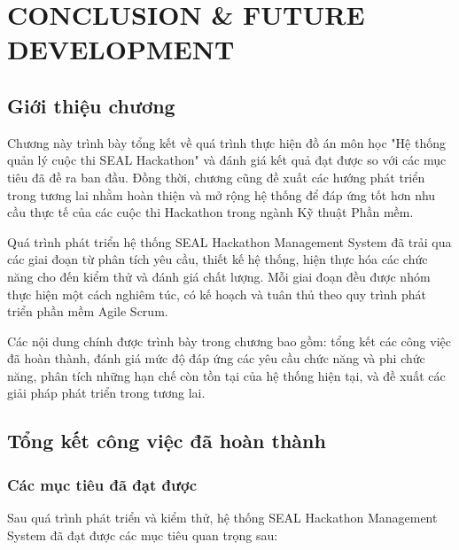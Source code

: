 ﻿\documentclass[12pt,a4paper]{report}
\begin{document}

\chapter{CONCLUSION \& FUTURE DEVELOPMENT}

\section{Giới thiệu chương}

Chương này trình bày tổng kết về quá trình thực hiện đồ án môn học "Hệ thống quản lý cuộc thi SEAL Hackathon" và đánh giá kết quả đạt được so với các mục tiêu đã đề ra ban đầu. Đồng thời, chương cũng đề xuất các hướng phát triển trong tương lai nhằm hoàn thiện và mở rộng hệ thống để đáp ứng tốt hơn nhu cầu thực tế của các cuộc thi Hackathon trong ngành Kỹ thuật Phần mềm.

Quá trình phát triển hệ thống SEAL Hackathon Management System đã trải qua các giai đoạn từ phân tích yêu cầu, thiết kế hệ thống, hiện thực hóa các chức năng cho đến kiểm thử và đánh giá chất lượng. Mỗi giai đoạn đều được nhóm thực hiện một cách nghiêm túc, có kế hoạch và tuân thủ theo quy trình phát triển phần mềm Agile Scrum.

Các nội dung chính được trình bày trong chương bao gồm: tổng kết các công việc đã hoàn thành, đánh giá mức độ đáp ứng các yêu cầu chức năng và phi chức năng, phân tích những hạn chế còn tồn tại của hệ thống hiện tại, và đề xuất các giải pháp phát triển trong tương lai.


\section{Tổng kết công việc đã hoàn thành}

\subsection{Các mục tiêu đã đạt được}

Sau quá trình phát triển và kiểm thử, hệ thống SEAL Hackathon Management System đã đạt được các mục tiêu quan trọng sau:
\end{document}
